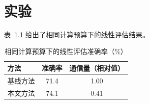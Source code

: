 \chapter{实验}
\label{ch:results}

表~\ref{tab:linear} 给出了相同计算预算下的线性评估结果。

\begin{table}[htbp]
  \centering
  \caption{相同计算预算下的线性评估准确率（\%）}
  \label{tab:linear}
  \begin{tabular}{lcc}
    \toprule
    方法 & 准确率 & 通信量（相对值） \\
    \midrule
    基线方法 & 71.4 & 1.00 \\
    本文方法 & 74.1 & 0.41 \\
    \bottomrule
  \end{tabular}
\end{table}
